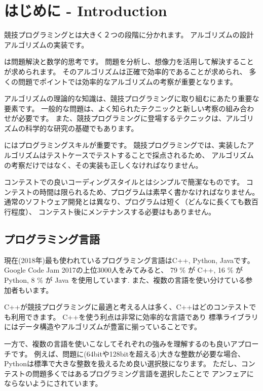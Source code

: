\chapter{はじめに - Introduction}

競技プログラミングとは大きく２つの段階に分かれます。
アルゴリズムの設計アルゴリズムの実装です。

 は問題解決と数学的思考です。
問題を分析し、想像力を活用して解決することが求められます。
そのアルゴリズムは正確で効率的であることが求められ、
多くの問題でポイントでは効率的なアルゴリズムの考察が重要となります。

アルゴリズムの理論的な知識は、競技プログラミングに取り組むにあたり重要な要素です。
一般的な問題は、よく知られたテクニックと新しい考察の組み合わせが必要です。
また、競技プログラミングに登場するテクニックは、アルゴリズムの科学的な研究の基礎でもあります。

 にはプログラミングスキルが重要です。
競技プログラミングでは、実装したアルゴリズムはテストケースでテストすることで採点されるため、
アルゴリズムの考察だけではなく、その実装も正しくなければなりません。

コンテストでの良いコーディングスタイルとはシンプルで簡潔なものです。
コンテストの時間は限られるため、プログラムは素早く書かなければなりません。
通常のソフトウェア開発とは異なり、プログラムは短く（どんなに長くても数百行程度）、
コンテスト後にメンテナンスする必要はもありません。

\section{プログラミング言語}


現在(2018年)最も使われているプログラミング言語はC++, Python, Javaです。
Google Code Jam 2017の上位3000人をみてみると、
79 \% が C++,
16 \% が Python,
8 \% が Java を使用しています\cite{goo17}.
また、複数の言語を使い分けている参加者もいます。

C++が競技プログラミングに最適と考える人は多く、C++はどのコンテストでも利用できます。
C++を使う利点は非常に効率的な言語であり
標準ライブラリにはデータ構造やアルゴリズムが豊富に揃っていることです。

一方で、複数の言語を使いこなしてそれぞれの強みを理解するのも良いアプローチです。
例えば、問題に(64bitや128bitを超える)大きな整数が必要な場合、
Pythonは標準で大きな整数を扱えるため良い選択肢になります。
ただし、コンテストの問題多くではあるプログラミング言語を選択したことで
アンフェアにならないようにされています。

